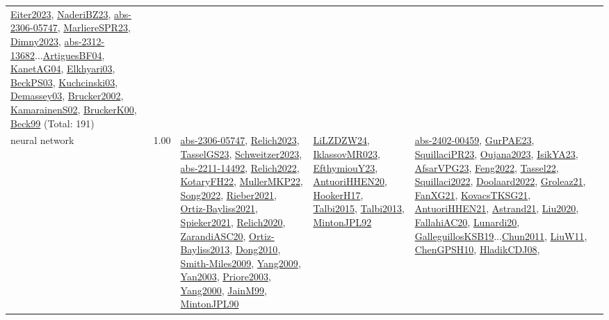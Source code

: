 {\begin{longtable}{p{3cm}r>{\raggedright\arraybackslash}p{6cm}>{\raggedright\arraybackslash}p{6cm}>{\raggedright\arraybackslash}p{8cm}}
\hyperref[detail:Eiter2023]{Eiter2023}, \hyperref[detail:NaderiBZ23]{NaderiBZ23}, \hyperref[detail:abs-2306-05747]{abs-2306-05747}, \hyperref[detail:MarliereSPR23]{MarliereSPR23}, \hyperref[detail:Dimny2023]{Dimny2023}, \hyperref[detail:abs-2312-13682]{abs-2312-13682}...\hyperref[detail:ArtiguesBF04]{ArtiguesBF04}, \hyperref[detail:KanetAG04]{KanetAG04}, \hyperref[detail:Elkhyari03]{Elkhyari03}, \hyperref[detail:BeckPS03]{BeckPS03}, \hyperref[detail:Kuchcinski03]{Kuchcinski03}, \hyperref[detail:Demassey03]{Demassey03}, \hyperref[detail:Brucker2002]{Brucker2002}, \hyperref[detail:KamarainenS02]{KamarainenS02}, \hyperref[detail:BruckerK00]{BruckerK00}, \hyperref[detail:Beck99]{Beck99} (Total: 191)\\
\index{neural network}\index{Algorithms!neural network}neural network &  1.00 & \hyperref[detail:abs-2306-05747]{abs-2306-05747}, \hyperref[detail:Relich2023]{Relich2023}, \hyperref[detail:TasselGS23]{TasselGS23}, \hyperref[detail:Schweitzer2023]{Schweitzer2023}, \hyperref[detail:abs-2211-14492]{abs-2211-14492}, \hyperref[detail:Relich2022]{Relich2022}, \hyperref[detail:KotaryFH22]{KotaryFH22}, \hyperref[detail:MullerMKP22]{MullerMKP22}, \hyperref[detail:Song2022]{Song2022}, \hyperref[detail:Rieber2021]{Rieber2021}, \hyperref[detail:Ortiz-Bayliss2021]{Ortiz-Bayliss2021}, \hyperref[detail:Spieker2021]{Spieker2021}, \hyperref[detail:Relich2020]{Relich2020}, \hyperref[detail:ZarandiASC20]{ZarandiASC20}, \hyperref[detail:Ortiz-Bayliss2013]{Ortiz-Bayliss2013}, \hyperref[detail:Dong2010]{Dong2010}, \hyperref[detail:Smith-Miles2009]{Smith-Miles2009}, \hyperref[detail:Yang2009]{Yang2009}, \hyperref[detail:Yan2003]{Yan2003}, \hyperref[detail:Priore2003]{Priore2003}, \hyperref[detail:Yang2000]{Yang2000}, \hyperref[detail:JainM99]{JainM99}, \hyperref[detail:MintonJPL90]{MintonJPL90} & \hyperref[detail:LiLZDZW24]{LiLZDZW24}, \hyperref[detail:IklassovMR023]{IklassovMR023}, \hyperref[detail:EfthymiouY23]{EfthymiouY23}, \hyperref[detail:AntuoriHHEN20]{AntuoriHHEN20}, \hyperref[detail:HookerH17]{HookerH17}, \hyperref[detail:Talbi2015]{Talbi2015}, \hyperref[detail:Talbi2013]{Talbi2013}, \hyperref[detail:MintonJPL92]{MintonJPL92} & \hyperref[detail:abs-2402-00459]{abs-2402-00459}, \hyperref[detail:GurPAE23]{GurPAE23}, \hyperref[detail:SquillaciPR23]{SquillaciPR23}, \hyperref[detail:Oujana2023]{Oujana2023}, \hyperref[detail:IsikYA23]{IsikYA23}, \hyperref[detail:AfsarVPG23]{AfsarVPG23}, \hyperref[detail:Feng2022]{Feng2022}, \hyperref[detail:Tassel22]{Tassel22}, \hyperref[detail:Squillaci2022]{Squillaci2022}, \hyperref[detail:Doolaard2022]{Doolaard2022}, \hyperref[detail:Groleaz21]{Groleaz21}, \hyperref[detail:FanXG21]{FanXG21}, \hyperref[detail:KovacsTKSG21]{KovacsTKSG21}, \hyperref[detail:AntuoriHHEN21]{AntuoriHHEN21}, \hyperref[detail:Astrand21]{Astrand21}, \hyperref[detail:Liu2020]{Liu2020}, \hyperref[detail:FallahiAC20]{FallahiAC20}, \hyperref[detail:Lunardi20]{Lunardi20}, \hyperref[detail:GalleguillosKSB19]{GalleguillosKSB19}...\hyperref[detail:Chun2011]{Chun2011}, \hyperref[detail:LiuW11]{LiuW11}, \hyperref[detail:ChenGPSH10]{ChenGPSH10}, \hyperref[detail:HladikCDJ08]{HladikCDJ08}, 
\end{longtable}}
